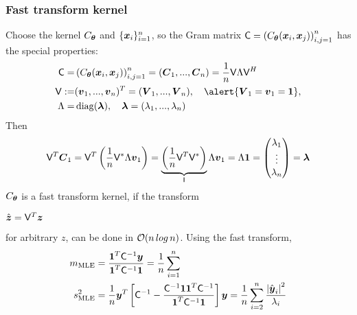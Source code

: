\documentclass[10pt,compress,xcolor={usenames,dvipsnames}]{beamer} %
\renewcommand{\mLambda}{\Lambda}
\newcommand{\MLE}{\text{MLE}}
\newcommand{\vC}{\bvec{C}}
\newcommand{\mCInv}{\mC^{-1}}
\newcommand{\redroundmathbox}[1]{\parbox{\widthof{$#1$\hspace{1em}}}
	{\begin{mdframed}[style=redshade]\centering $#1$ \end{mdframed}}}
\def\abs#1{\ensuremath{\left \lvert #1 \right \rvert}}
\begin{document}
\begin{frame}
\frametitle{Fast transform kernel}
\vspace{-5ex}
Choose the kernel $C_{\boldsymbol{\theta}}$ and $\{\boldsymbol{x}_i\}_{i=1}^n$, so the Gram matrix $\mathsf{C} =  \left( C_{\boldsymbol{\theta}} (\boldsymbol{x}_i,\boldsymbol{x}_j) \right)_{i,j=1}^n$ has the special properties:
\vspace{-2ex}
\begin{align*}
\mC =& \left( C_{\vtheta} (\vx_i,\vx_j) \right)_{i,j=1}^n 
= (\vC_1,...,\vC_n)
=  \frac 1n \mV \mLambda \mV^H 
\\
\mV :=& (\vv_1,...,\vv_n)^T = (\vV_1,...,\vV_n), \quad
\alert{\vV_1 = \vv_1 = \vone}, 
\\ 
\mLambda =& \diag (\vlambda), \quad \vlambda = (\lambda_1,...,\lambda_n)
\end{align*}
Then
\pause 
\vspace{-5ex}
\begin{align*}
\mV^T \vC_1 = \mV^T \left( \frac 1n \mV^* \mLambda \vv_1 \right) =
\underbrace{\left( \frac 1n \mV^T  \mV^* \right) }_{\mathsf{I}} \mLambda \vv_1  =  \mLambda \vone =
\begin{pmatrix}
\lambda_1 \\ \vdots \\ \lambda_n
\end{pmatrix} = \vlambda
\end{align*}
\vspace{-1ex}
$C_{\boldsymbol{\theta}}$ is a fast transform kernel, if the transform 
{
\redroundmathbox{
{
\text{$\hat{\vz} = \mV^T \vz$ }
 } } }
for arbitrary $z$, can be done in \alert{$\operatorname{{\mathcal O}}( n \, log\, n) $}. Using the fast transform,
\vspace{-1ex}
\begin{align*}
m_\MLE &= \frac{\vone^T \mCInv \vy}{\vone^T \mCInv \vone}  = \frac{1}{n} \sum_{i=1}^n 
\\
s^2_\MLE &= \frac 1n \vy^T \left[ \mCInv - \frac{\mCInv \vone \vone^T \mCInv}{\vone^T \mCInv \vone} \right] \vy = \frac 1n \sum_{i=2}^n \frac{\abs{\hat{\vy}_i}^2}{\lambda_i}
\end{align*}

\end{frame}
\end{document}
